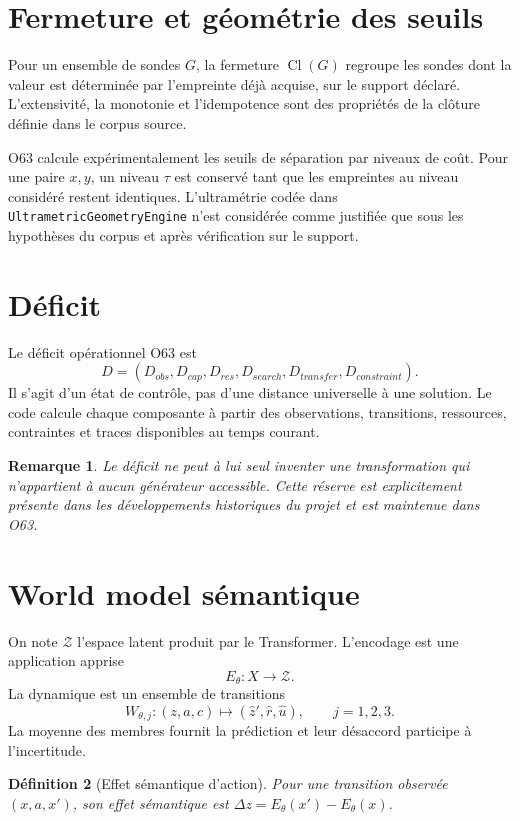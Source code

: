 \documentclass[11pt,a4paper]{article}
\newtheorem{definition}{Définition}[section]
\newtheorem{remark}[definition]{Remarque}
\newcommand{\code}[1]{\texttt{#1}}
\newcommand{\Z}{\mathcal{Z}}
\begin{document}
\section{Fermeture et géométrie des seuils}
Pour un ensemble de sondes $G$, la fermeture $\operatorname{Cl}(G)$ regroupe les sondes dont la valeur est déterminée par l’empreinte déjà acquise, sur le support déclaré. L’extensivité, la monotonie et l’idempotence sont des propriétés de la clôture définie dans le corpus source.

O63 calcule expérimentalement les seuils de séparation par niveaux de coût. Pour une paire $x,y$, un niveau $\tau$ est conservé tant que les empreintes au niveau considéré restent identiques. L’ultramétrie codée dans \code{UltrametricGeometryEngine} n’est considérée comme justifiée que sous les hypothèses du corpus et après vérification sur le support.

\section{Déficit}
Le déficit opérationnel O63 est
\[
D=(D_{obs},D_{cap},D_{res},D_{search},D_{transfer},D_{constraint}).
\]
Il s’agit d’un état de contrôle, pas d’une distance universelle à une solution. Le code calcule chaque composante à partir des observations, transitions, ressources, contraintes et traces disponibles au temps courant.

\begin{remark}
Le déficit ne peut à lui seul inventer une transformation qui n’appartient à aucun générateur accessible. Cette réserve est explicitement présente dans les développements historiques du projet et est maintenue dans O63.
\end{remark}

\section{World model sémantique}
On note $\Z$ l’espace latent produit par le Transformer. L’encodage est une application apprise
\[
E_\theta:X\to\Z.
\]
La dynamique est un ensemble de transitions
\[
W_{\theta,j}: (z,a,c)\mapsto(\hat z',\hat r,\hat u),
\qquad j=1,2,3.
\]
La moyenne des membres fournit la prédiction et leur désaccord participe à l’incertitude.

\begin{definition}[Effet sémantique d’action]
Pour une transition observée $(x,a,x')$, son effet sémantique est $\Delta z=E_\theta(x')-E_\theta(x)$.
\end{definition}
\end{document}
